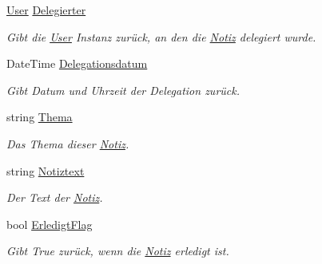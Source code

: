 \begin{DoxyCompactItemize}
\hyperlink{class_products_1_1_model_1_1_entities_1_1_user}{User} \hyperlink{class_products_1_1_model_1_1_entities_1_1_notiz_adde831628d37eb8807d78eec35fe552f}{Delegierter}
\begin{DoxyCompactList}\small\item\em Gibt die \hyperlink{class_products_1_1_model_1_1_entities_1_1_user}{User} Instanz zurück, an den die \hyperlink{class_products_1_1_model_1_1_entities_1_1_notiz}{Notiz} delegiert wurde. \end{DoxyCompactList}\item 
Date\+Time \hyperlink{class_products_1_1_model_1_1_entities_1_1_notiz_aac420f36e934138f3a0e9074ae83c053}{Delegationsdatum}
\begin{DoxyCompactList}\small\item\em Gibt Datum und Uhrzeit der Delegation zurück. \end{DoxyCompactList}\item 
string \hyperlink{class_products_1_1_model_1_1_entities_1_1_notiz_a32133706d08a49289851a6e12cce0dbf}{Thema}
\begin{DoxyCompactList}\small\item\em Das Thema dieser \hyperlink{class_products_1_1_model_1_1_entities_1_1_notiz}{Notiz}. \end{DoxyCompactList}\item 
string \hyperlink{class_products_1_1_model_1_1_entities_1_1_notiz_a7714b196daa4265a4dbeefdcb1d8c237}{Notiztext}
\begin{DoxyCompactList}\small\item\em Der Text der \hyperlink{class_products_1_1_model_1_1_entities_1_1_notiz}{Notiz}. \end{DoxyCompactList}\item 
bool \hyperlink{class_products_1_1_model_1_1_entities_1_1_notiz_ade0317b474c065d96c400cc0d69c086f}{Erledigt\+Flag}
\begin{DoxyCompactList}\small\item\em Gibt True zurück, wenn die \hyperlink{class_products_1_1_model_1_1_entities_1_1_notiz}{Notiz} erledigt ist. \end{DoxyCompactList}\item 

\end{DoxyCompactItemize}
